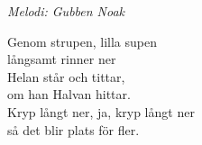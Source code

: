 {\footnotesize\textit{Melodi: Gubben Noak}}\par
\vspace{10pt}
Genom strupen, lilla supen\\
långsamt rinner ner\\
Helan står och tittar,\\
om han Halvan hittar.\\
Kryp långt ner, ja, kryp långt ner\\
så det blir plats för fler.
